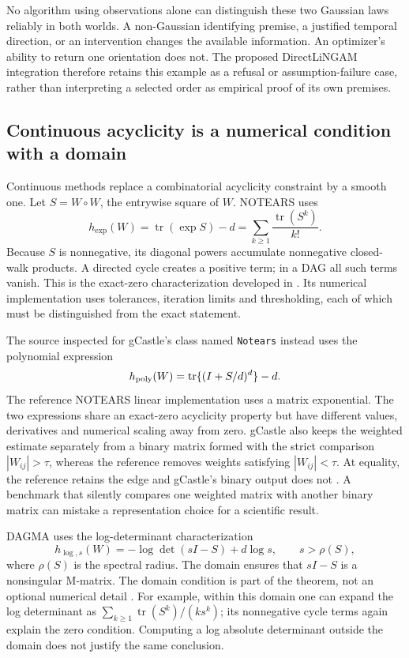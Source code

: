 No algorithm using observations alone can distinguish these two Gaussian laws
reliably in both worlds. A non-Gaussian identifying premise, a justified
temporal direction, or an intervention changes the available information.
An optimizer's ability to return one orientation does not. The proposed
DirectLiNGAM integration therefore retains this example as a refusal or
assumption-failure case, rather than interpreting a selected order as empirical
proof of its own premises.

\subsection{Continuous acyclicity is a numerical condition with a domain}

Continuous methods replace a combinatorial acyclicity constraint by a smooth
one. Let \(S=W\circ W\), the entrywise square of \(W\). NOTEARS uses
\begin{equation}
 h_{\exp}(W)=\operatorname{tr}(\exp S)-d
             =\sum_{k\geq1}\frac{\operatorname{tr}(S^k)}{k!}.
\end{equation}
Because \(S\) is nonnegative, its diagonal powers accumulate nonnegative
closed-walk products. A directed cycle creates a positive term; in a DAG all
such terms vanish. This is the exact-zero characterization developed in
\citet{notears2018}. Its numerical implementation uses tolerances, iteration
limits and thresholding, each of which must be distinguished from the exact
statement.

The source inspected for gCastle's class named \texttt{Notears} instead uses
the polynomial expression
\begin{equation}
 h_{\rm poly}(W)=\operatorname{tr}\{(I+S/d)^d\}-d.
\end{equation}
The reference NOTEARS linear implementation uses a matrix exponential. The
two expressions share an exact-zero acyclicity property but have different
values, derivatives and numerical scaling away from zero. gCastle also keeps
the weighted estimate separately from a binary matrix formed with the strict
comparison \(|W_{ij}|>\tau\), whereas the reference removes weights satisfying
\(|W_{ij}|<\tau\). At equality, the reference retains the edge and gCastle's
binary output does not \citep{exec13_pydisc_gcastle,exec13_pydisc_notears}.
A benchmark that silently compares one weighted matrix with another binary
matrix can mistake a representation choice for a scientific result.

DAGMA uses the log-determinant characterization
\begin{equation}
 h_{\log,s}(W)=-\log\det(sI-S)+d\log s,
 \qquad s>\rho(S),
\end{equation}
where \(\rho(S)\) is the spectral radius. The domain ensures that \(sI-S\) is
a nonsingular M-matrix. The domain condition is part of the theorem, not an
optional numerical detail \citep{exec13_pydisc_dagma2022}. For example, within
this domain one can expand the log determinant as
\(\sum_{k\geq1}\operatorname{tr}(S^k)/(k s^k)\); its nonnegative cycle terms
again explain the zero condition. Computing a log absolute determinant outside
the domain does not justify the same conclusion.

